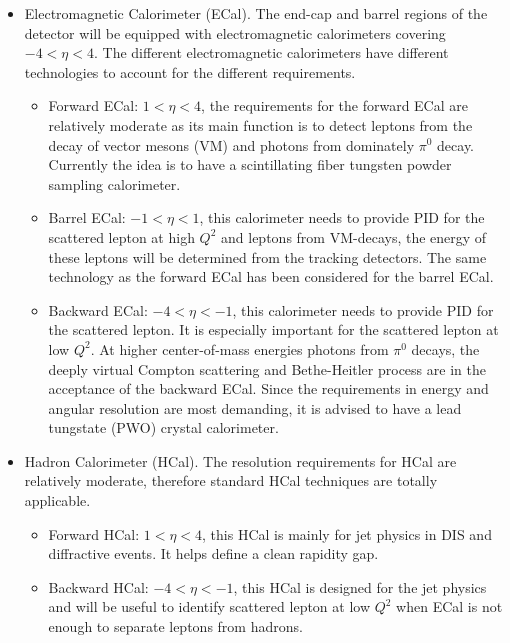 \begin{itemize}
\item Electromagnetic Calorimeter (ECal). The end-cap and barrel regions of the
detector will be equipped with electromagnetic calorimeters covering
$-4<\eta<4$. The different electromagnetic calorimeters have different
technologies to account for the different requirements.


\begin{itemize}
\item Forward ECal: $1<\eta<4$, the requirements for the forward ECal are relatively
moderate as its main function is to detect leptons from the decay of vector mesons (VM) and
photons from dominately $\pi^{0}$ decay. Currently the idea is to have a scintillating fiber tungsten
powder sampling calorimeter. 
\item Barrel ECal: $-1<\eta<1$, this calorimeter needs to provide PID for the scattered lepton at high $Q^{2}$ and leptons from VM-decays, the energy of these leptons will be determined from the tracking detectors. 
The same technology as the forward ECal has been considered for the barrel ECal.
\item Backward ECal: $-4<\eta<-1$, this calorimeter needs to provide PID for the scattered
lepton. It is especially important for the scattered lepton at low $Q^{2}$. At
higher center-of-mass energies photons from $\pi^{0}$ decays, the deeply virtual Compton scattering and Bethe-Heitler
process are in the acceptance of the backward ECal. Since the requirements in
energy and angular resolution are most demanding, it is advised to have a lead tungstate (PWO)
crystal calorimeter.
\end{itemize}
\end{itemize}

\begin{itemize}
\item Hadron Calorimeter (HCal). The resolution requirements for HCal are relatively moderate, therefore standard HCal techniques are totally applicable.  

\begin{itemize}

\item Forward HCal: $1<\eta<4$, this HCal is mainly for jet physics in DIS and diffractive events. It helps define a clean rapidity gap.

\item Backward HCal: $-4<\eta<-1$, this HCal is designed for the jet physics and will be useful to identify scattered lepton at low $Q^{2}$
when ECal is not enough to separate leptons from hadrons. 

\end{itemize}
\end{itemize}

